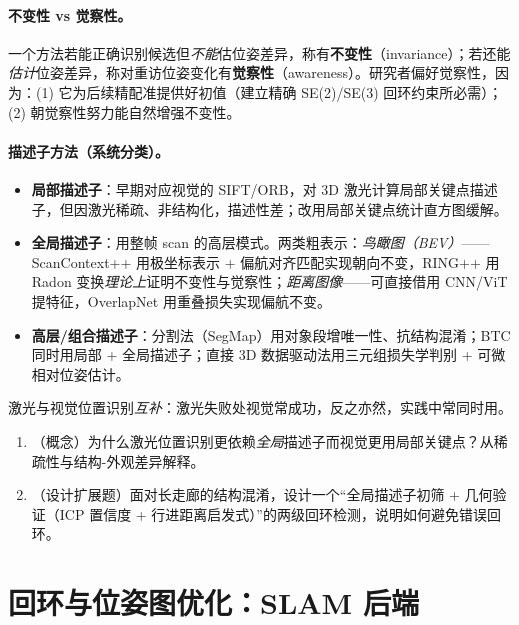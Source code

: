 \paragraph{不变性 vs 觉察性。}
一个方法若能正确识别候选但\emph{不能}估位姿差异，称有\textbf{不变性}（invariance）；若还能\emph{估计}位姿差异，称对重访位姿变化有\textbf{觉察性}（awareness）\cite{carlone2026handbook}。研究者偏好觉察性，因为：(1) 它为后续精配准提供好初值（建立精确 SE(2)/SE(3) 回环约束所必需）；(2) 朝觉察性努力能自然增强不变性。

\paragraph{描述子方法（系统分类）。}
\begin{itemize}
  \item \textbf{局部描述子}：早期对应视觉的 SIFT/ORB，对 3D 激光计算局部关键点描述子\cite{carlone2026handbook}，但因激光稀疏、非结构化，描述性差；改用局部关键点统计直方图缓解。
  \item \textbf{全局描述子}：用整帧 scan 的高层模式。两类粗表示：\emph{鸟瞰图（BEV）}——ScanContext++\cite{kim2018scancontext} 用极坐标表示 + 偏航对齐匹配实现朝向不变，RING++\cite{lu2023ringpp} 用 Radon 变换\emph{理论上}证明不变性与觉察性；\emph{距离图像}——可直接借用 CNN/ViT 提特征，OverlapNet\cite{chen2020overlapnet} 用重叠损失实现偏航不变。
  \item \textbf{高层/组合描述子}：分割法（SegMap\cite{dube2017segmap}）用对象段增唯一性、抗结构混淆；BTC 同时用局部 + 全局描述子；直接 3D 数据驱动法用三元组损失学判别 + 可微相对位姿估计\cite{carlone2026handbook}。
\end{itemize}
激光与视觉位置识别\emph{互补}：激光失败处视觉常成功，反之亦然，实践中常同时用。

\begin{practice}
\begin{enumerate}
  \item （概念）为什么激光位置识别更依赖\emph{全局}描述子而视觉更用局部关键点？从稀疏性与结构-外观差异解释。
  \item （设计扩展题）面对长走廊的结构混淆，设计一个“全局描述子初筛 + 几何验证（ICP 置信度 + 行进距离启发式）”的两级回环检测，说明如何避免错误回环。
\end{enumerate}
\end{practice}

\section{回环与位姿图优化：SLAM 后端}
\label{sec:lidar-loop}

